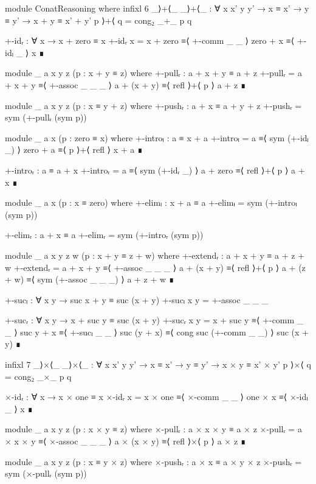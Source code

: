 \begin{code}[hide]
  module ConatReasoning where
    infixl 6 _⟩+⟨_
    _⟩+⟨_ : ∀ {x x' y y'} → x ≡ x' → y ≡ y' → x + y ≡ x' + y'
    p ⟩+⟨ q = cong₂ _+_ p q

    +-idᵣ : ∀ x → x + zero ≡ x
    +-idᵣ x =
      x + zero ≡⟨ +-comm _ _ ⟩
      zero + x ≡⟨ +-idₗ _ ⟩
      x        ∎

    module _ {a x y z} (p : x + y ≡ z) where
      +-pullᵣ : a + x + y ≡ a + z
      +-pullᵣ =
        a + x + y   ≡⟨ +-assoc _ _ _ ⟩
        a + (x + y) ≡⟨ refl ⟩+⟨ p ⟩
        a + z       ∎

    module _ {a x y z} (p : x ≡ y + z) where
      +-pushᵣ : a + x ≡ a + y + z
      +-pushᵣ = sym (+-pullᵣ (sym p))

    module _ {a x} (p : zero ≡ x) where
      +-introₗ : a ≡ x + a
      +-introₗ =
        a        ≡⟨ sym (+-idₗ _) ⟩
        zero + a ≡⟨ p ⟩+⟨ refl ⟩
        x + a    ∎

      +-introᵣ : a ≡ a + x
      +-introᵣ =
        a        ≡⟨ sym (+-idᵣ _) ⟩
        a + zero ≡⟨ refl ⟩+⟨ p ⟩
        a + x    ∎

    module _ {a x} (p : x ≡ zero) where
      +-elimₗ : x + a ≡ a
      +-elimₗ = sym (+-introₗ (sym p))

      +-elimᵣ : a + x ≡ a
      +-elimᵣ = sym (+-introᵣ (sym p))

    module _ {a x y z w} (p : x + y ≡ z + w) where
      +-extendᵣ : a + x + y ≡ a + z + w
      +-extendᵣ =
        a + x + y   ≡⟨ +-assoc _ _ _ ⟩
        a + (x + y) ≡⟨ refl ⟩+⟨ p ⟩
        a + (z + w) ≡⟨ sym (+-assoc _ _ _) ⟩
        a + z + w   ∎

    +-sucₗ : ∀ x y → suc x + y ≡ suc (x + y)
    +-sucₗ x y = +-assoc _ _ _

    +-sucᵣ : ∀ x y → x + suc y ≡ suc (x + y)
    +-sucᵣ x y =
      x + suc y   ≡⟨ +-comm _ _ ⟩
      suc y + x   ≡⟨ +-sucₗ _ _ ⟩
      suc (y + x) ≡⟨ cong suc (+-comm _ _) ⟩
      suc (x + y) ∎

    infixl 7 _⟩×⟨_
    _⟩×⟨_ : ∀ {x x' y y'} → x ≡ x' → y ≡ y' → x × y ≡ x' × y'
    p ⟩×⟨ q = cong₂ _×_ p q

    ×-idᵣ : ∀ x → x × one ≡ x
    ×-idᵣ x =
      x × one ≡⟨ ×-comm _ _ ⟩
      one × x ≡⟨ ×-idₗ _ ⟩
      x       ∎

    module _ {a x y z} (p : x × y ≡ z) where
      ×-pullᵣ : a × x × y ≡ a × z
      ×-pullᵣ =
        a × x × y   ≡⟨ ×-assoc _ _ _ ⟩
        a × (x × y) ≡⟨ refl ⟩×⟨ p ⟩
        a × z       ∎

    module _ {a x y z} (p : x ≡ y × z) where
      ×-pushᵣ : a × x ≡ a × y × z
      ×-pushᵣ = sym (×-pullᵣ (sym p))


\end{code}
